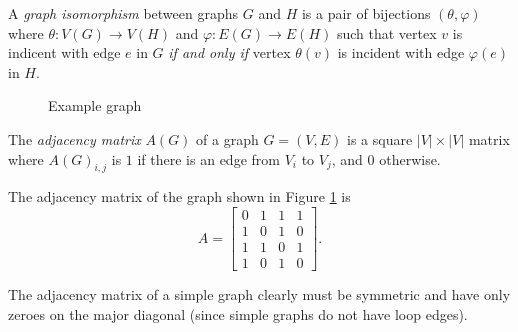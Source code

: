 \begin{defn}
    A \emph{graph isomorphism} between graphs $G$ and $H$ is a pair of bijections $(\theta, \varphi)$ where $\theta: V(G) \to V(H)$ and $\varphi: E(G) \to E(H)$ such that vertex $v$ is indicent with edge $e$ in $G$ \emph{if and only if} vertex $\theta(v)$ is incident with edge $\varphi(e)$ in $H$.
\end{defn}

\begin{figure}[ht!]
    \centering
\caption{Example graph}
\label{fig:adjacency-example}
\end{figure}

\begin{defn}
    The \emph{adjacency matrix} $A(G)$ of a graph $G = (V, E)$ is a square $|V| \times |V|$ matrix where $A(G)_{i, j}$ is $1$ if there is an edge from $V_i$ to $V_j$, and $0$ otherwise.
\end{defn}

\begin{exmp}
    The adjacency matrix of the graph shown in Figure \ref{fig:adjacency-example} is
    \[A = \begin{bmatrix}
        0 & 1 & 1 & 1 \\
        1 & 0 & 1 & 0 \\
        1 & 1 & 0 & 1 \\
        1 & 0 & 1 & 0
    \end{bmatrix}.\]
\end{exmp}

\begin{rmk}
    The adjacency matrix of a simple graph clearly must be symmetric and have only zeroes on the major diagonal (since simple graphs do not have loop edges).
\end{rmk}

